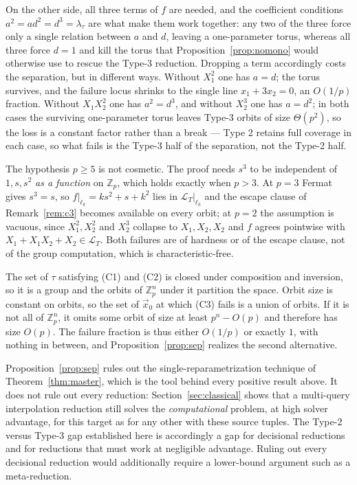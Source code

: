 \documentclass{conjura-solution}
\newcommand{\Zp}{\mathbb{Z}_p}
\newcommand{\vx}{\vec{x}}
\newcommand{\LL}{\mathcal{L}}
\begin{document}
On the other side, all three terms of $f$ are needed, and the coefficient conditions
$a^{2}=ad^{2}=d^{3}=\lambda_\tau$ are what make them work together: any two of the three force
only a single relation between $a$ and $d$, leaving a one-parameter torus, whereas all three
force $d=1$ and kill the torus that Proposition~\ref{prop:nomono} would otherwise use to
rescue the Type-3 reduction. Dropping a term accordingly costs the separation, but in
different ways. Without $X_1^{2}$ one has $a=d$; the torus survives, and the failure locus
shrinks to the single line $x_1+3x_2=0$, an $O(1/p)$ fraction. Without $X_1X_2^{2}$ one has
$a^{2}=d^{3}$, and without $X_2^{3}$ one has $a=d^{2}$; in both cases the surviving
one-parameter torus leaves Type-3 orbits of size $\Theta(p^{2})$, so the loss is a constant
factor rather than a break --- Type 2 retains full coverage in each case, so what fails is the
Type-3 half of the separation, not the Type-2 half.

The hypothesis $p\ge 5$ is not cosmetic. The proof needs $s^{3}$ to be independent of
$1,s,s^{2}$ \emph{as a function} on $\Zp$, which holds exactly when $p>3$. At $p=3$ Fermat
gives $s^{3}=s$, so $f|_{\ell_k}=ks^{2}+s+k^{2}$ lies in $\LL_T|_{\ell_k}$ and the escape
clause of Remark~\ref{rem:c3} becomes available on every orbit; at $p=2$ the assumption is
vacuous, since $X_1^{2},X_2^{2}$ and $X_2^{3}$ collapse to $X_1,X_2,X_2$ and $f$ agrees
pointwise with $X_1+X_1X_2+X_2\in\LL_T$. Both failures are of hardness or of the escape
clause, not of the group computation, which is characteristic-free.

\begin{remark}
\label{rem:dichotomy}
The set of $\tau$ satisfying (C1) and (C2) is closed under composition and inversion, so it is
a group and the orbits of $\Zp^{n}$ under it partition the space. Orbit size is constant on
orbits, so the set of $\vx_0$ at which (C3) fails is a union of orbits. If it is not all of
$\Zp^{n}$, it omits some orbit of size at least $p^{n}-O(p)$ and therefore has size $O(p)$.
The failure fraction is thus either $O(1/p)$ or exactly $1$, with nothing in between, and
Proposition~\ref{prop:sep} realizes the second alternative.
\end{remark}

Proposition~\ref{prop:sep} rules out the single-reparametrization technique of
Theorem~\ref{thm:master}, which is the tool behind every positive result above. It does not
rule out every reduction: Section~\ref{sec:classical} shows that a multi-query interpolation
reduction still solves the \emph{computational} problem, at high solver advantage, for this
target as for any other with these source tuples. The Type-2 versus Type-3 gap established
here is accordingly a gap for decisional reductions and for reductions that must work at
negligible advantage. Ruling out every decisional reduction would additionally require a
lower-bound argument such as a meta-reduction.
\end{document}
